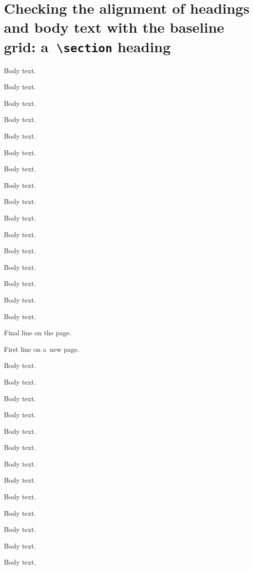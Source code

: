 \section*{Checking the alignment of headings and body text with the baseline grid: a~\texttt{\textbackslash section} heading}
Body text.\displaybaselinegrid \par
Body text. \par
Body text. \par
Body text. \par
Body text. \par
Body text. \par
Body text. \par
Body text. \par
Body text. \par
Body text. \par
Body text. \par
Body text. \par
Body text. \par
Body text. \par
Body text. \par
Body text. \par
Final line on the page. \par

\pagebreak

First line on a~new page. \par
Body text. \par
Body text. \par
Body text. \par
Body text. \par
Body text. \par
Body text. \par
Body text. \par
Body text. \par
Body text. \par
Body text. \par
Body text. \par
Body text. \par
Body text. \par
